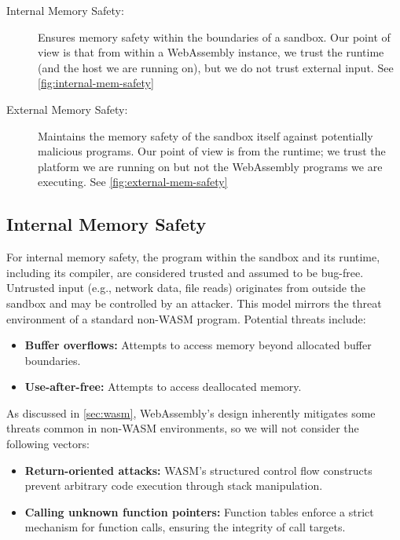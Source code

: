 \begin{description}
    \item[Internal Memory Safety:] Ensures memory safety within the boundaries of a sandbox.
    Our point of view is that from within a WebAssembly instance, we trust the runtime (and the host we are running on), but we do not trust external input.
    See \cref{fig:internal-mem-safety}
    \item[External Memory Safety:] Maintains the memory safety of the sandbox itself against potentially malicious programs.
    Our point of view is from the runtime; we trust the platform we are running on but not the WebAssembly programs we are executing.
    See \cref{fig:external-mem-safety}
\end{description}

\subsection{Internal Memory Safety}
\label{subsec:internal-memory-safety}
For internal memory safety, the program within the sandbox and its runtime, including its compiler, are considered trusted and assumed to be bug-free.
Untrusted input (e.g., network data, file reads) originates from outside the sandbox and may be controlled by an attacker.
This model mirrors the threat environment of a standard non-\ac{WASM} program.
Potential threats include:

\begin{itemize}
    \item \textbf{Buffer overflows:} Attempts to access memory beyond allocated buffer boundaries.
    \item \textbf{Use-after-free:} Attempts to access deallocated memory.
\end{itemize}

As discussed in \cref{sec:wasm}, WebAssembly's design inherently mitigates some threats common in non-\ac{WASM} environments, so we will not consider the following vectors:

\begin{itemize}
    \item \textbf{Return-oriented attacks:} {\ac{WASM}'s} structured control flow constructs prevent arbitrary code execution through stack manipulation.
    \item \textbf{Calling unknown function pointers:} Function tables enforce a strict mechanism for function calls, ensuring the integrity of call targets.
\end{itemize}

